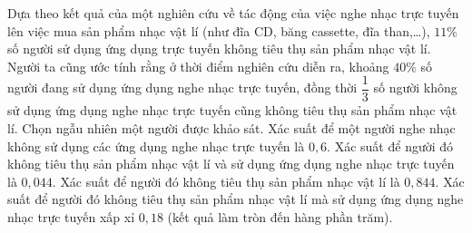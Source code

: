 \begin{ex}
Dựa theo kết quả của một nghiên cứu về tác động của việc nghe nhạc trực tuyến lên việc mua sản phẩm nhạc vật lí (như đĩa CD, băng cassette, đĩa than,\dots), $11\%$ số người sử dụng ứng dụng trực tuyến không tiêu thụ sản phẩm nhạc vật lí. Người ta cũng ước tính rằng ở thời điểm nghiên cứu diễn ra, khoảng $40\%$ số người đang sử dụng ứng dụng nghe nhạc trực tuyến, đồng thời $\dfrac13$ số người không sử dụng ứng dụng nghe nhạc trực tuyến cũng không tiêu thụ sản phẩm nhạc vật lí. Chọn ngẫu nhiên một người được khảo sát.
\choiceTF
{\True Xác suất để một người nghe nhạc không sử dụng các ứng dụng nghe nhạc trực tuyến là $0{,}6$.}
{\True Xác suất để người đó không tiêu thụ sản phẩm nhạc vật lí và sử dụng ứng dụng nghe nhạc trực tuyến là $0{,}044$.}
{Xác suất để người đó không tiêu thụ sản phẩm nhạc vật lí là $0{,}844$.}
{\True Xác suất để người đó không tiêu thụ sản phẩm nhạc vật lí mà sử dụng ứng dụng nghe nhạc trực tuyến xấp xỉ $0{,}18$ (kết quả làm tròn đến hàng phần trăm).}
\end{ex}
